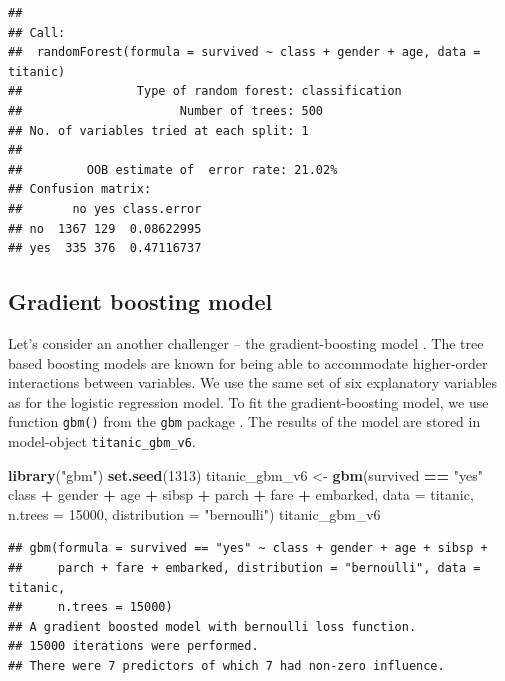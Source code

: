 \documentclass[]{krantz}
\newenvironment{Shaded}{\begin{snugshade}}{\end{snugshade}}
\newcommand{\DataTypeTok}[1]{\textcolor[rgb]{0.13,0.29,0.53}{#1}}
\newcommand{\DecValTok}[1]{\textcolor[rgb]{0.00,0.00,0.81}{#1}}
\newcommand{\KeywordTok}[1]{\textcolor[rgb]{0.13,0.29,0.53}{\textbf{#1}}}
\newcommand{\NormalTok}[1]{#1}
\newcommand{\OperatorTok}[1]{\textcolor[rgb]{0.81,0.36,0.00}{\textbf{#1}}}
\newcommand{\StringTok}[1]{\textcolor[rgb]{0.31,0.60,0.02}{#1}}
\begin{document}
\begin{verbatim}
## 
## Call:
##  randomForest(formula = survived ~ class + gender + age, data = titanic) 
##                Type of random forest: classification
##                      Number of trees: 500
## No. of variables tried at each split: 1
## 
##         OOB estimate of  error rate: 21.02%
## Confusion matrix:
##       no yes class.error
## no  1367 129  0.08622995
## yes  335 376  0.47116737
\end{verbatim}

\hypertarget{model-titanic-gbm}{%
\subsection{Gradient boosting model}\label{model-titanic-gbm}}

Let's consider an another challenger -- the gradient-boosting model \citep{Friedman00greedyfunction}. The tree based boosting models are known for being able to accommodate higher-order interactions between variables. We use the same set of six explanatory variables as for the logistic regression model. To fit the gradient-boosting model, we use function \texttt{gbm()} from the \texttt{gbm} package \citep{gbm}. The results of the model are stored in model-object \texttt{titanic\_gbm\_v6}.

\begin{Shaded}
\begin{Highlighting}[]
\KeywordTok{library}\NormalTok{(}\StringTok{"gbm"}\NormalTok{)}
\KeywordTok{set.seed}\NormalTok{(}\DecValTok{1313}\NormalTok{)}
\NormalTok{titanic_gbm_v6 <-}\StringTok{ }\KeywordTok{gbm}\NormalTok{(survived }\OperatorTok{==}\StringTok{ "yes"} \OperatorTok{~}\StringTok{ }\NormalTok{class }\OperatorTok{+}\StringTok{ }\NormalTok{gender }\OperatorTok{+}\StringTok{ }\NormalTok{age }\OperatorTok{+}\StringTok{ }\NormalTok{sibsp }\OperatorTok{+}\StringTok{ }
\StringTok{         }\NormalTok{parch }\OperatorTok{+}\StringTok{ }\NormalTok{fare }\OperatorTok{+}\StringTok{ }\NormalTok{embarked, }\DataTypeTok{data =}\NormalTok{ titanic, }\DataTypeTok{n.trees =} \DecValTok{15000}\NormalTok{, }
         \DataTypeTok{distribution =} \StringTok{"bernoulli"}\NormalTok{)}
\NormalTok{titanic_gbm_v6}
\end{Highlighting}
\end{Shaded}

\begin{verbatim}
## gbm(formula = survived == "yes" ~ class + gender + age + sibsp + 
##     parch + fare + embarked, distribution = "bernoulli", data = titanic, 
##     n.trees = 15000)
## A gradient boosted model with bernoulli loss function.
## 15000 iterations were performed.
## There were 7 predictors of which 7 had non-zero influence.
\end{verbatim}
\end{document}
